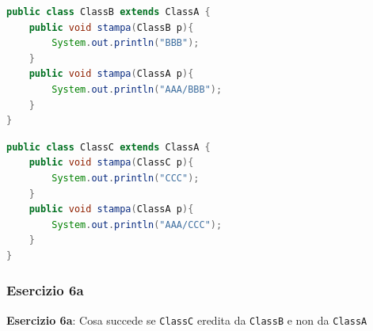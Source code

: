 \documentclass{article}
\begin{document}
\begin{lstlisting}[language=Java,escapechar=|]
public class ClassB extends ClassA {
	public void stampa(ClassB p){
		System.out.println("BBB");
	}
	public void stampa(ClassA p){
		System.out.println("AAA/BBB");
	}
}
\end{lstlisting}

\begin{lstlisting}[language=Java,escapechar=|]
public class ClassC extends ClassA {
	public void stampa(ClassC p){
		System.out.println("CCC");
	}
	public void stampa(ClassA p){
		System.out.println("AAA/CCC");
	}
}
\end{lstlisting}

\subsubsection{Esercizio 6a}
\begin{framed}
\textbf{Esercizio 6a}: Cosa succede se \texttt{ClassC} eredita da \texttt{ClassB} e non da \texttt{ClassA}
\end{framed}
\end{document}
